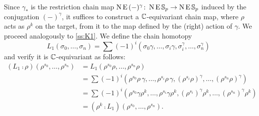 Since $\gamma_\ast$ is the restriction chain map $\operatorname{N}\operatorname{E}\,(-)^\gamma \colon \operatorname{N}\operatorname{E}\mathbb{S}_p \to \operatorname{N}\operatorname{E}\mathbb{S}_p$ induced by the conjugation $(-)^\gamma$, it suffices to construct a $\mathbb{C}$-equivariant chain map, where $\rho$ acts as $\rho^k$ on the target, from it to the map defined by the (right) action of $\gamma$.
We proceed analogously to \cref{ss:K1}.
We define the chain homotopy
\[
L_1(\sigma_0,\dots,\sigma_n) = \sum (-1)^i (\sigma_0\gamma,\dots,\sigma_i\gamma,\sigma_i^\gamma,\dots,\sigma_n^\gamma)
\]
and verify it is $\mathbb{C}$-equivariant as follows:
\begin{align*}
	(L_1 \comp \rho)(\rho^{s_0},\dots,\rho^{s_n}) &=
	L_1(\rho^{s_0}\rho, \dots, \rho^{s_n}\rho) \\ &=
	\sum (-1)^i (\rho^{s_0} \rho\,\gamma,\dots,\rho^{s_i} \rho\,\gamma,(\rho^{s_i} \rho)^\gamma,\dots,(\rho^{s_n} \rho)^\gamma) \\ &=
	\sum (-1)^i (\rho^{s_0} \gamma \rho^k,\dots,\rho^{s_i} \gamma \rho^k,(\rho^{s_i})^\gamma \rho^k ,\dots,(\rho^{s_n})^\gamma \rho^k) \\ &=
	(\rho^k \comp L_1)(\rho^{s_0},\dots,\rho^{s_n}).
\end{align*}